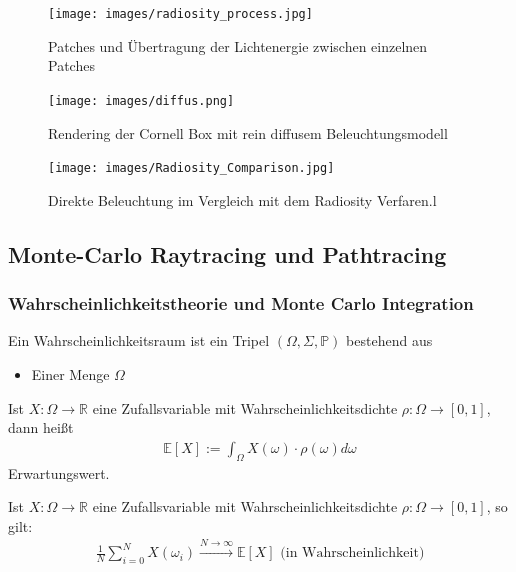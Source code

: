  \begin{figure}[H]
    \centering
    \texttt{[image: images/radiosity\_process.jpg]}
    \caption{Patches und Übertragung der Lichtenergie zwischen einzelnen Patches}
    \label{fig:diffus}
\end{figure}

 \begin{figure}[H]
    \centering
    \texttt{[image: images/diffus.png]}
    \caption{Rendering der Cornell Box mit rein diffusem Beleuchtungsmodell}
    \label{fig:diffus}
\end{figure}

 \begin{figure}[H]
    \centering
    \texttt{[image: images/Radiosity\_Comparison.jpg]}
    \caption{Direkte Beleuchtung im Vergleich mit dem Radiosity Verfaren.l}
    \label{fig:diffus}
\end{figure}
\subsection{Monte-Carlo Raytracing und Pathtracing}
\subsubsection{Wahrscheinlichkeitstheorie und Monte Carlo Integration}  
Ein Wahrscheinlichkeitsraum ist ein Tripel $(\Omega, \Sigma, \mathbb{P})$ bestehend aus
\begin{itemize}
\item Einer Menge $\Omega$
\end{itemize}


\begin{Definition}
Ist $X: \Omega \to \mathbb{R}$ eine  Zufallsvariable mit Wahrscheinlichkeitsdichte $\rho: \Omega \to [0,1]$, dann heißt
\begin{align}
\mathbb{E}[X] := \int_{\Omega} X(\omega) \cdot \rho(\omega) d\omega 
\end{align}
Erwartungswert.
\end{Definition}


\begin{Satz}
Ist $X: \Omega \to \mathbb{R}$ eine  Zufallsvariable mit Wahrscheinlichkeitsdichte $\rho: \Omega \to [0,1]$, so gilt:
\begin{align}
\frac{1}{N} \sum_{i= 0}^{N} X(\omega_i) \xrightarrow{ N \to \infty } \mathbb{E}[X] \text{ (in Wahrscheinlichkeit)}
\end{align}
\end{Satz}


